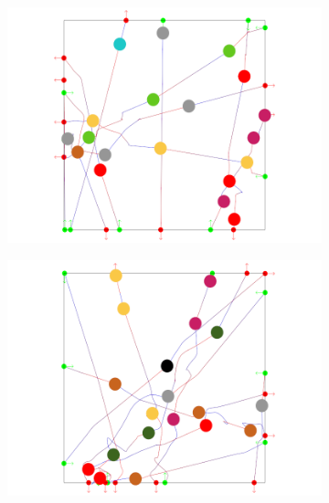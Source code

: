 \begin{figure}[t]
 \centering
 \begin{subfigure}[b]{0.24\linewidth}
 	\includegraphics[width=\linewidth]{images/res-10-withAgents_1.png}
 	\caption{}
 \end{subfigure}
 \begin{subfigure}[b]{0.24\linewidth}
 	\includegraphics[width=\linewidth]{images/res-10-withAgents_2.png}
 	\caption{}
 \end{subfigure}
 \begin{subfigure}[b]{0.24\linewidth}

\end{subfigure}
\end{figure}
